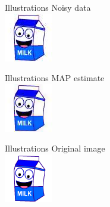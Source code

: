 \documentclass[10pt]{beamer}
\begin{document}
\begin{frame}{Illustrations}
\centering
Noisy data
\\
\includegraphics[height=40ex]{results/milk-tmp} 
\end{frame}
\begin{frame}{Illustrations}
\centering
MAP estimate\vphantom{y}
\\
\includegraphics[height=40ex]{results/milk-fixed}
\end{frame}
\begin{frame}{Illustrations}
\centering
Original image
\\
\includegraphics[height=40ex]{results/milk} 
\end{frame}
\end{document}
